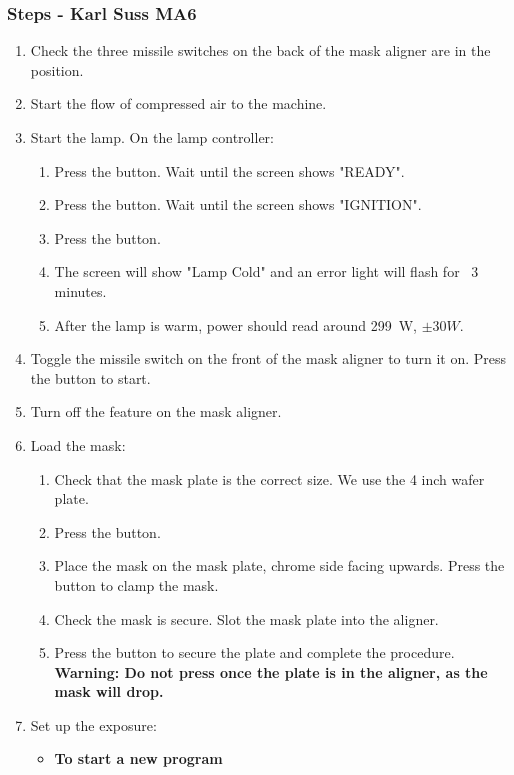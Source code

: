 \subsubsection{Steps - Karl Suss MA6}
\begin{enumerate}
\item Check the three missile switches on the back of the mask aligner are in the  position.
\item Start the flow of compressed air to the machine.
\item Start the lamp. On the lamp controller:
\begin{enumerate}
  \item Press the  button. Wait until the screen shows "READY".
  \item Press the  button. Wait until the screen shows "IGNITION".
  \item Press the  button.
  \item The screen will show "Lamp Cold" and an error light will flash for ~3 minutes.
  \item After the lamp is warm, power should read around \SI{299}{W}, $\pm \si{30}{W}$.
\end{enumerate}
\item Toggle the missile switch on the front of the mask aligner to turn it on. Press the 
      button to start.
\item Turn off the  feature on the mask aligner.
\item Load the mask:
\begin{enumerate}
  \item Check that the mask plate is the correct size. We use the 4 inch wafer plate.
  \item Press the  button.
  \item Place the mask on the mask plate, chrome side facing upwards. Press the  button to clamp the mask.
  \item Check the mask is secure. Slot the mask plate into the aligner.
  \item Press the  button to secure the plate and complete the procedure. \textbf{Warning: Do not press
         once the plate is in the aligner, as the mask will drop.}
\end{enumerate}
\item Set up the exposure:
\begin{itemize} [noitemsep, nolistsep]
  \item \textbf{To start a new program}

\end{itemize}
\end{enumerate}
